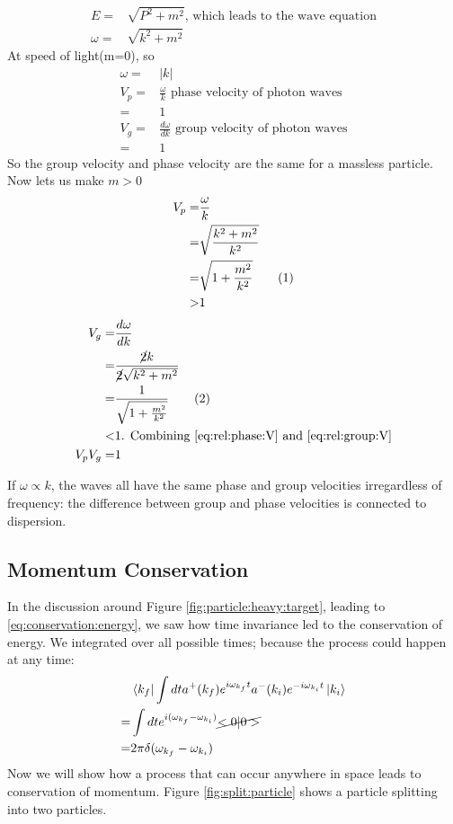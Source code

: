 \documentclass[]{article}
\newcommand\numberthis{\addtocounter{equation}{1}\tag{\theequation}}
\begin{document}
\begin{align*}
	E =& \sqrt{P^2 + m^2} \text{, which leads to the wave equation}\\
	\omega =& \sqrt{k^2 + m^2}
\end{align*}
At speed of light(m=0), so
\begin{align*}
	\omega =& \left| k \right|\\
	V_p =& \frac{\omega}{k} \text{ phase velocity of photon waves}\\
	 =&1\\
	 V_g =& \frac{d\omega}{dk} \text{ group velocity of photon waves}\\
	 =&1
\end{align*}
So the group velocity and phase velocity are the same for a massless particle. Now lets us make $m>0$
\begin{align*}
	V_p =& \frac{\omega}{k}\\
	=&\sqrt{\frac{k^2+m^2}{k^2}}\\
	=&\sqrt{1+\frac{m^2}{k^2}} \numberthis \label{eq:rel:phase:V}\\
	>&1
\end{align*}
\begin{align*}
	V_g =& \frac{d\omega}{dk} \\
	=& \frac{\cancel{2}k}{\cancel{2}\sqrt{k^2+m^2}}\\
	=& \frac{1}{\sqrt{1+\frac{m^2}{k^2}}} \numberthis \label{eq:rel:group:V}\\
	<&1 \text{. Combining \eqref{eq:rel:phase:V} and \eqref{eq:rel:group:V}}\\
	V_p V_g =& 1
\end{align*}

If $\omega\propto k$, the waves all have the same phase and group velocities irregardless of frequency: the difference between group and phase velocities is connected to dispersion.

\subsection{Momentum Conservation}\label{sec:momentum:conservation}

In the discussion around Figure \ref{fig:particle:heavy:target}, leading to \eqref{eq:conservation:energy}, we saw how time invariance led to the conservation of energy. We integrated over all possible times; because the process could happen at any time:
\begin{align*}
	&\bra{k_f}  \int dt a^+(k_f) e^{i \omega_{k_f} t}  a^-(k_i) e^{-i \omega_{k_i} t} \ket{k_i}\\
	=&  \int dt e^{i(\omega_{k_f}-\omega_{k_i})}\cancel{<0|0>}\\
	=& 2 \pi  \delta(\omega_{k_f}-\omega_{k_i})
\end{align*}
Now we will show how a process that can occur anywhere in space leads to conservation of momentum.  Figure \ref{fig:split:particle} shows a particle splitting into two particles. 
 
\end{document}
